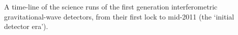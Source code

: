 \label{figure:runtimes}
A time-line of the science runs of the first generation interferometric gravitational-wave detectors, from their first lock to mid-2011 (the `initial detector era').
